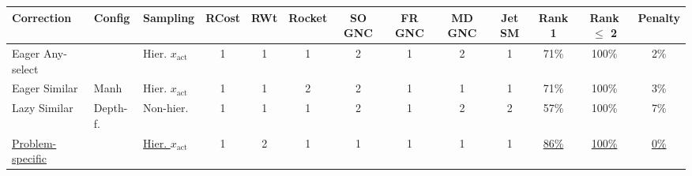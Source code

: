 \begin{tabular}{lllcccccccccc}
\toprule
Correction & Config & Sampling & RCost & RWt & Rocket & SO GNC & FR GNC & MD GNC & Jet SM & Rank 1 & Rank $\leq$ 2 & Penalty \\
\midrule
Eager Any-select &  & Hier. $x_{\mathrm{act}}$  & {\cellcolor[HTML]{00441B}} \color[HTML]{F1F1F1} 1 & {\cellcolor[HTML]{00441B}} \color[HTML]{F1F1F1} 1 & {\cellcolor[HTML]{00441B}} \color[HTML]{F1F1F1} 1 & {\cellcolor[HTML]{F7FCF5}} \color[HTML]{000000} 2 & {\cellcolor[HTML]{00441B}} \color[HTML]{F1F1F1} 1 & {\cellcolor[HTML]{F7FCF5}} \color[HTML]{000000} 2 & {\cellcolor[HTML]{00441B}} \color[HTML]{F1F1F1} 1 & {\cellcolor[HTML]{2B7BBA}} \color[HTML]{F1F1F1} 71\% & {\cellcolor[HTML]{08306B}} \color[HTML]{F1F1F1} 100\% & {\cellcolor[HTML]{006227}} \color[HTML]{F1F1F1} 2\% \\
Eager Similar & Manh & Hier. $x_{\mathrm{act}}$  & {\cellcolor[HTML]{00441B}} \color[HTML]{F1F1F1} 1 & {\cellcolor[HTML]{00441B}} \color[HTML]{F1F1F1} 1 & {\cellcolor[HTML]{F7FCF5}} \color[HTML]{000000} 2 & {\cellcolor[HTML]{F7FCF5}} \color[HTML]{000000} 2 & {\cellcolor[HTML]{00441B}} \color[HTML]{F1F1F1} 1 & {\cellcolor[HTML]{00441B}} \color[HTML]{F1F1F1} 1 & {\cellcolor[HTML]{00441B}} \color[HTML]{F1F1F1} 1 & {\cellcolor[HTML]{2B7BBA}} \color[HTML]{F1F1F1} 71\% & {\cellcolor[HTML]{08306B}} \color[HTML]{F1F1F1} 100\% & {\cellcolor[HTML]{0A7633}} \color[HTML]{F1F1F1} 3\% \\
Lazy Similar & Depth-f. & Non-hier.   & {\cellcolor[HTML]{00441B}} \color[HTML]{F1F1F1} 1 & {\cellcolor[HTML]{00441B}} \color[HTML]{F1F1F1} 1 & {\cellcolor[HTML]{00441B}} \color[HTML]{F1F1F1} 1 & {\cellcolor[HTML]{F7FCF5}} \color[HTML]{000000} 2 & {\cellcolor[HTML]{00441B}} \color[HTML]{F1F1F1} 1 & {\cellcolor[HTML]{F7FCF5}} \color[HTML]{000000} 2 & {\cellcolor[HTML]{F7FCF5}} \color[HTML]{000000} 2 & {\cellcolor[HTML]{539ECD}} \color[HTML]{F1F1F1} 57\% & {\cellcolor[HTML]{08306B}} \color[HTML]{F1F1F1} 100\% & {\cellcolor[HTML]{3EA75A}} \color[HTML]{F1F1F1} 7\% \\
\underline{Problem-specific } & \underline{} & \underline{Hier. $x_{\mathrm{act}}$ } & {\cellcolor[HTML]{00441B}} \color[HTML]{F1F1F1} 1 & {\cellcolor[HTML]{F7FCF5}} \color[HTML]{000000} 2 & {\cellcolor[HTML]{00441B}} \color[HTML]{F1F1F1} 1 & {\cellcolor[HTML]{00441B}} \color[HTML]{F1F1F1} 1 & {\cellcolor[HTML]{00441B}} \color[HTML]{F1F1F1} 1 & {\cellcolor[HTML]{00441B}} \color[HTML]{F1F1F1} 1 & {\cellcolor[HTML]{00441B}} \color[HTML]{F1F1F1} 1 & {\cellcolor[HTML]{0B559F}} \color[HTML]{F1F1F1} \underline{86\%} & {\cellcolor[HTML]{08306B}} \color[HTML]{F1F1F1} \underline{100\%} & {\cellcolor[HTML]{00441B}} \color[HTML]{F1F1F1} \underline{0\%} \\

\end{tabular}
